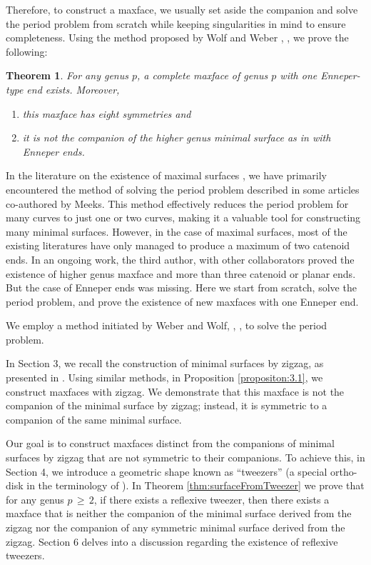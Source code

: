 \documentclass[12pt,epsfig,tikz,multi]{amsart}
\newtheorem{theorem}{Theorem}[section]
\numberwithin{equation}{section}
\begin{document}
Therefore, to construct a maxface, we usually set aside the companion and solve the period problem from scratch while keeping singularities in mind to ensure completeness.
Using the method proposed by Wolf and Weber \cite{weber1998minimal}, \cite{Weber1998TeichmullerTA}, we prove the following:

\begin{theorem}
For any genus $p$, a complete maxface of genus $p$ with one Enneper-type end exists. Moreover,
\begin{enumerate}
\item this maxface has  eight symmetries and
\item it is not the companion of the higher genus minimal surface as in \cite{weber1998minimal} with Enneper ends. 
\end{enumerate}
\end{theorem}

In the literature on the existence of maximal surfaces \cite{Fujimori2007, Fujimori2009, Kim2006}, we have primarily encountered the 
method of solving the period problem described in some articles \cite{Meeks1989, meeks2018triply, hoffman1990embedded} co-authored by 
Meeks. This method effectively reduces the period problem for many curves to just one or two curves, making it a valuable tool for 
constructing many minimal surfaces. However, in the case of maximal surfaces, most of the existing literatures have only managed to 
produce a maximum of two catenoid ends. In an ongoing work, the third author, with other collaborators \cite{CDMP} proved the existence 
of higher genus maxface and more than three catenoid or planar ends. But the case of Enneper ends was missing. Here we start from 
scratch, solve the period problem, and prove the existence of new maxfaces with one Enneper end\color{black}.

We employ a method initiated by Weber and Wolf, \cite{weber1998minimal}, \cite{Weber1998TeichmullerTA}, to solve the period problem.

In Section 3, we recall the construction of minimal surfaces by zigzag, as presented in \cite{weber1998minimal}. Using similar methods, 
in Proposition \ref{propositon:3.1}, we construct maxfaces with zigzag. We demonstrate that this maxface is not the 
companion of the minimal surface by zigzag; instead, it is symmetric to a companion of the same minimal surface.

Our goal is to construct maxfaces distinct from the companions of minimal surfaces by zigzag that are not symmetric to their companions. To 
achieve this, in Section 4, we introduce a geometric shape known as ``tweezers'' (a special ortho-disk in the terminology of 
\cite{Weber1998TeichmullerTA}). In Theorem \ref{thm:surfaceFromTweezer} we prove that for any genus $p \,\geq\, 2$, if 
there exists a reflexive tweezer, then there exists a maxface that is neither the companion of the minimal surface derived from the 
zigzag nor the companion of any symmetric minimal surface derived from the zigzag. Section 6 delves into a discussion regarding the 
existence of reflexive tweezers.
\end{document}
